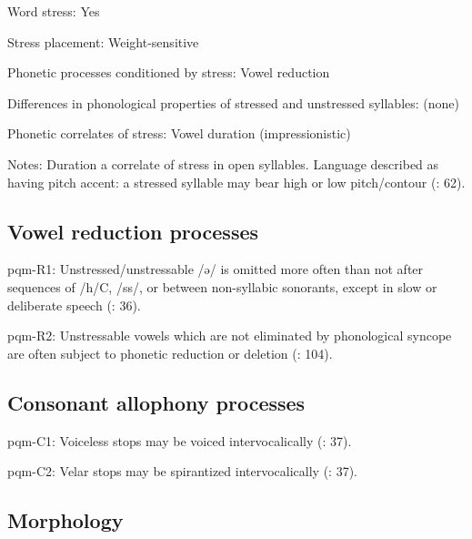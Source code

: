 {\begin{appendixdesc}
\item[Word stress:] Yes

\item[Stress placement:] Weight-sensitive

\item[Phonetic processes conditioned by stress:] Vowel reduction

\item[Differences in phonological properties of stressed and unstressed syllables:] (none)

\item[Phonetic correlates of stress:] Vowel duration (impressionistic)

\item[Notes:] Duration a correlate of stress in open syllables. Language described as having pitch accent: a stressed syllable may bear high or low pitch/contour (\citealt{LeSourd1993}: 62).
\end{appendixdesc}
\subsection*{Vowel reduction processes}
\begin{appendixdesc}

\item[pqm-R1:] Unstressed/unstressable /ə/ is omitted more often than not after sequences of /h/C, /ss/, or between non-syllabic sonorants, except in slow or deliberate speech (\citealt{LeSourd1993}: 36).

\item[pqm-R2:] Unstressable vowels which are not eliminated by phonological syncope are often subject to phonetic reduction or deletion (\citealt{LeSourd1993}: 104).
\end{appendixdesc}
\subsection*{Consonant allophony processes}
\begin{appendixdesc}

\item[pqm-C1:] Voiceless stops may be voiced intervocalically (\citealt{LeSourd1993}: 37).

\item[pqm-C2:] Velar stops may be spirantized intervocalically (\citealt{LeSourd1993}: 37).
\end{appendixdesc}
\subsection*{Morphology}

}
